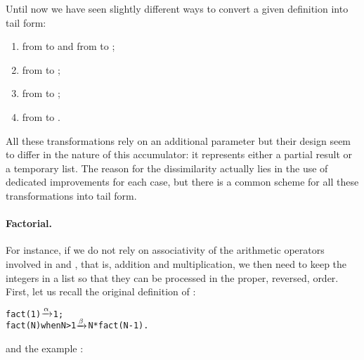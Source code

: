 Until now we have seen slightly different ways to convert a given
definition into tail form:
\begin{enumerate}

  \item from  to  and from
     to ;

  \item from  to ;

  \item from  to ;

  \item from  to .

\end{enumerate}
All these transformations rely on an additional parameter but their
design seem to differ in the nature of this accumulator: it represents
either a partial result or a temporary list. The reason for the
dissimilarity actually lies in the use of dedicated improvements for
each case, but there is a common scheme for all these transformations
into tail form.

\medskip

\paragraph{Factorial.}

For instance, if we do not rely on associativity of the arithmetic
operators involved in  and , that is,
addition and multiplication, we then need to keep the integers in a
list so that they can be processed in the proper, reversed,
order. First, let us recall the original definition of
:
\begin{alltt}
fact(1)            \(\smashedrightarrow{\alpha}\) 1;
fact(N) when N > 1 \(\smashedrightarrow{\beta}\) N * fact(N-1).
\end{alltt}
and the example :



